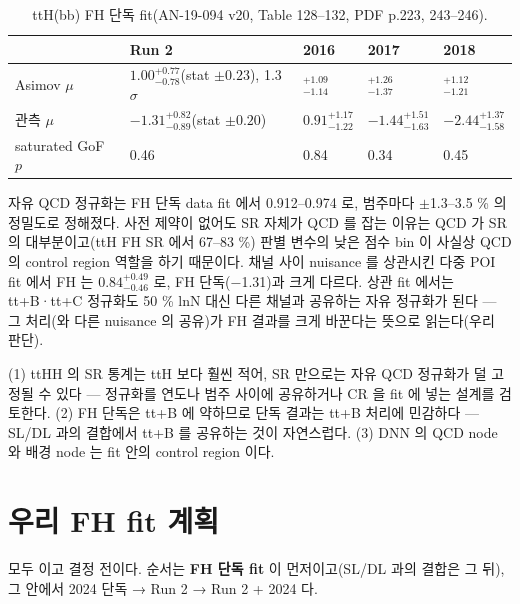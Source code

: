 \begin{table}[htbp]
\centering
\caption{ttH(bb) FH 단독 fit(AN-19-094 v20, Table 128--132, PDF p.223, 243--246).}
\label{tab:stats-tth}
\small
\begin{tabular}{@{}lllll@{}}
\toprule
 & Run 2 & 2016 & 2017 & 2018 \\
\midrule
Asimov $\mu$ & $1.00^{+0.77}_{-0.78}$(stat $\pm0.23$), 1.3$\sigma$ & $^{+1.09}_{-1.14}$ & $^{+1.26}_{-1.37}$ & $^{+1.12}_{-1.21}$ \\
관측 $\mu$ & $-1.31^{+0.82}_{-0.89}$(stat $\pm0.20$) & $0.91^{+1.17}_{-1.22}$ & $-1.44^{+1.51}_{-1.63}$ & $-2.44^{+1.37}_{-1.58}$ \\
saturated GoF $p$ & 0.46 & 0.84 & 0.34 & 0.45 \\
\bottomrule
\end{tabular}
\end{table}

자유 QCD 정규화는 FH 단독 data fit 에서 0.912--0.974 로, 범주마다 $\pm$1.3--3.5 \% 의 정밀도로 정해졌다. 사전 제약이
없어도 SR 자체가 QCD 를 잡는 이유는 QCD 가 SR 의 대부분이고(ttH FH SR 에서 67--83 \%) 판별 변수의 낮은 점수 bin 이 사실상 QCD 의 control
region 역할을 하기 때문이다. 채널 사이 nuisance 를 상관시킨 다중 POI fit 에서 FH 는 $0.84^{+0.49}_{-0.46}$ 로, FH 단독(−1.31)과 크게
다르다. 상관 fit 에서는 tt+B·tt+C 정규화도 50 \% lnN 대신 다른 채널과 공유하는 자유 정규화가 된다
 — 그 처리(와 다른 nuisance 의 공유)가 FH 결과를 크게 바꾼다는 뜻으로 읽는다(우리 판단).

\begin{note}
(1) ttHH 의 SR 통계는 ttH 보다 훨씬 적어, SR 만으로는 자유 QCD 정규화가 덜 고정될 수 있다 — 정규화를 연도나 범주 사이에 공유하거나 CR 을 fit 에 넣는
설계를 검토한다. (2) FH 단독은 tt+B 에 약하므로 단독 결과는 tt+B 처리에 민감하다 — SL/DL 과의 결합에서 tt+B 를 공유하는 것이 자연스럽다.
(3) DNN 의 QCD node 와 배경 node 는 fit 안의 control region 이다.
\end{note}

\section{우리 FH fit 계획}\label{sec:stats-ours}

모두 \tagplan 이고 결정 전이다. 순서는 \textbf{FH 단독 fit} 이 먼저이고(SL/DL 과의 결합은 그 뒤), 그 안에서 2024 단독 → Run 2 → Run 2 + 2024 다.

